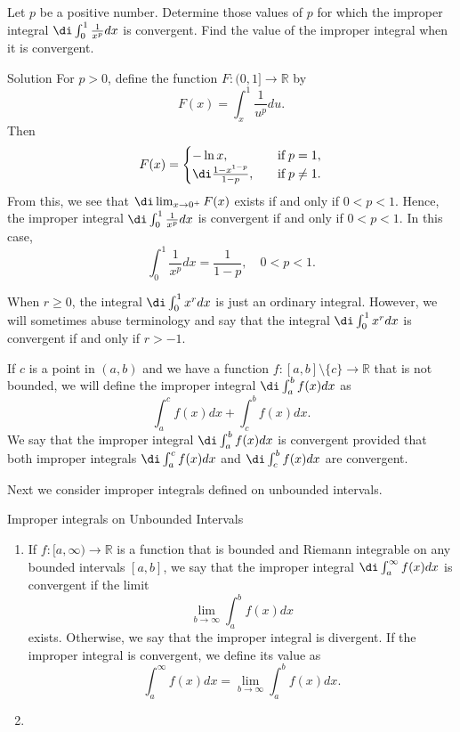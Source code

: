 \begin{example}[label=20230527]{}
\begin{example}[label=ex230227_10]{}
Let $p$ be a positive number. Determine those values of $p$ for which the improper integral $\di\int_0^1\frac{1}{x^p}dx$ is convergent. Find the value of the improper integral when it is convergent.
\end{example}
\begin{solution}
{Solution}
For $p>0$, define the function $F:(0, 1]\to\mathbb{R}$ by 
\[F(x)=\int_x^1\frac{1}{u^p}du.\]Then
\begin{align*}
F(x)=\begin{cases}-\ln x,\quad &\text{if}\; p=1,\\
\di \frac{1-x^{1-p}}{1-p},\quad &\text{if}\; p\neq 1.\end{cases}
\end{align*} From this, we see that
$\di \lim_{x\to 0^+}F(x)$ exists if and only if $0<p<1$. Hence, the improper integral  $\di\int_0^1\frac{1}{x^p}dx$ is convergent if and only if $0<p<1$. In this case, 
\[\int_0^1\frac{1}{x^p}dx=\frac{1}{1-p},\quad 0<p<1.\]
\end{solution}
When $r\geq 0$, the integral $\di\int_0^1 x^rdx$ is just an ordinary integral. However, we will sometimes abuse terminology and say that the integral $\di\int_0^1x^rdx$ is convergent if and only if $r>-1$. 
\begin{highlight}{}
If $c$ is a point in $(a,b)$ and we have a function $f:[a,b]\setminus\{c\}\to\mathbb{R}$  that is not bounded, we will define the improper integral $\di\int_a^bf(x)dx$ as 
\[\int_a^cf(x)dx+\int_c^bf(x)dx.\]
We say that  the improper integral $\di\int_a^bf(x)dx$ is convergent provided that both improper integrals $\di \int_a^cf(x)dx$ and $\di \int_c^bf(x)dx$ are convergent. 
\end{highlight}
Next we consider improper integrals defined on unbounded intervals.
\begin{definition}{Improper integrals on Unbounded Intervals}
\begin{enumerate}[1.]
\item
If $f:[a,\infty)\to\mathbb{R}$ is a  function that is bounded and Riemann integrable on any bounded intervals $[a, b]$, we say that the improper integral $\di\int_a^{\infty}f(x)dx$ is convergent if the limit
\[\lim_{b\to\infty}\int_a^{b}f(x)dx\] exists. Otherwise, we say that the improper integral is divergent.
If the improper integral is convergent, we define its value as  
\[\int_a^{\infty}f(x)dx=\lim_{b\to\infty}\int_a^{b}f(x)dx.\]
\item

\end{enumerate}
\end{definition}
\end{example}
